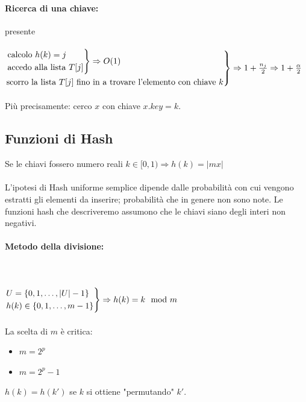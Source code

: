 \paragraph{Ricerca di una chiave:} presente \\~\\
$\begin{rcases}
    \begin{rcases}
        \text{calcolo } h(k) = j \\
        \text{accedo alla lista } T[j]
    \end{rcases}
    \Rightarrow O(1) \\
    \text{scorro la lista } T[j] \text{ fino in a trovare l'elemento con chiave } k
\end{rcases} \Rightarrow 1+\frac{n_j}{2} \Rightarrow 1+\frac{\alpha}{2}$ \\~\\

Più precisamente: cerco $x$ con chiave $x.key = k$.

\newpage
\subsection{Funzioni di Hash}
Se le chiavi fossero numero reali $k \in [0,1) \Rightarrow h(k)=|mx|$ \\~\\
L'ipotesi di Hash uniforme semplice dipende dalle probabilità con cui vengono estratti gli elementi da inserire; probabilità che in genere non sono note. Le funzioni hash che descriveremo assumono che le chiavi siano degli interi non negativi.

\paragraph{Metodo della divisione:}\;\\~\\
$\begin{rcases}
    U = \{0, 1, \ldots, |U|-1\} \\
    h(k) \in \{0, 1, \ldots, m-1\} \\
\end{rcases} \Rightarrow h(k) = k \mod m$ \\~\\

La scelta di $m$ è critica:
\begin{itemize}
    \item $m = 2^p$
    \item $m = 2^p - 1$
\end{itemize}
$h(k) = h(k')$ se $k$ si ottiene "permutando" $k'$.


